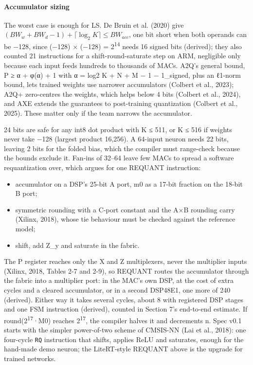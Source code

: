 \paragraph{Accumulator sizing} The worst case is enough for LS. De Bruin et al. (2020) give $(\mathit{BW}_w + \mathit{BW}_d - 1) + \lceil\log_2 K\rceil \le \mathit{BW}_\mathit{acc}$, one bit short when both operands can be −128, since (−128) × (−128) = 2\textsuperscript{14} needs 16 signed bits (derived); they also counted 21 instructions for a shift-round-saturate step on ARM, negligible only because each input feeds hundreds to thousands of MACs. A2Q's general bound, P ≥ α + φ(α) + 1 with α = log2 K + N + M − 1 − 1\_signed, plus an ℓ1-norm bound, lets trained weights use narrower accumulators (Colbert et al., 2023); A2Q+ zero-centres the weights, which helps below 4 bits (Colbert et al., 2024), and AXE extends the guarantees to post-training quantization (Colbert et al., 2025). These matter only if the team narrows the accumulator.

\begin{forls}
24 bits are safe for any int8 dot product with K ≤ 511, or K ≤ 516 if weights never take −128 (largest product 16,256). A 64-input neuron needs 22 bits, leaving 2 bits for the folded bias, which the compiler must range-check because the bounds exclude it. Fan-ins of 32–64 leave few MACs to spread a software requantization over, which argues for one REQUANT instruction:
\begin{itemize}
\item accumulator on a DSP's 25-bit A port, m0 as a 17-bit fraction on the 18-bit B port;
\item symmetric rounding with a C-port constant and the A×B rounding carry (Xilinx, 2018), whose tie behaviour must be checked against the reference model;
\item shift, add Z\_y and saturate in the fabric.
\end{itemize}

The P register reaches only the X and Z multiplexers, never the multiplier inputs (Xilinx, 2018, Tables 2-7 and 2-9), so REQUANT routes the accumulator through the fabric into a multiplier port: in the MAC's own DSP, at the cost of extra cycles and a cleared accumulator, or in a second DSP48E1, one more of 240 (derived). Either way it takes several cycles, about 8 with registered DSP stages and one FSM instruction (derived), counted in Section 7's end-to-end estimate. If round(2\textsuperscript{17}·M0) reaches 2\textsuperscript{17}, the compiler halves it and decrements n. Spec v0.1 starts with the simpler power-of-two scheme of CMSIS-NN (Lai et al., 2018): one four-cycle \texttt{RQ} instruction that shifts, applies ReLU and saturates, enough for the hand-made demo neuron; the LiteRT-style REQUANT above is the upgrade for trained networks.

\end{forls}

